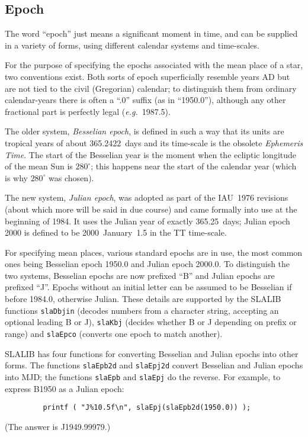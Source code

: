 \documentclass[11pt,fleqn,twoside]{article}
\renewcommand{\_}{{\tt\char'137}}     %
\begin{document}
\subsection{Epoch}
The word ``epoch'' just means a
significant moment in time, and can be supplied
in a variety of forms, using different calendar systems and time-scales.

For the purpose of specifying the epochs associated with the
mean place of a star, two conventions exist.  Both sorts of epoch
superficially resemble years AD but are not tied to the civil
(Gregorian) calendar;  to distinguish them from ordinary calendar-years
there is often
a ``.0'' suffix (as in ``1950.0''), although any other fractional
part is perfectly legal ({\it e.g.}\ 1987.5).

The older system,
{\it Besselian epoch}, is defined in such a way that its units are
tropical years of about 365.2422~days and its time-scale is the
obsolete {\it Ephemeris Time}.
The start of the Besselian year is the moment
when the ecliptic longitude of the mean Sun is
$280^{\circ}$;  this happens near the start of the
calendar year (which is why $280^{\circ}$ was chosen).
 
The new system, {\it Julian epoch}, was adopted as
part of the IAU~1976 revisions (about which more will be said
in due course) and came formally into use at the
beginning of 1984.  It uses the Julian year of exactly
365.25~days; Julian epoch 2000 is defined to be 2000~January~1.5 in the
TT time-scale.

For specifying mean places, various standard epochs are in use, the
most common ones being Besselian epoch 1950.0 and Julian epoch 2000.0.
To distinguish the two systems, Besselian epochs
are now prefixed ``B'' and Julian epochs are prefixed ``J''.
Epochs without an initial letter can be assumed to be Besselian
if before 1984.0, otherwise Julian.  These details are supported by
the SLALIB functions
{\tt slaDbjin}
(decodes numbers from a
character string, accepting an optional leading B or J),
{\tt slaKbj}
(decides whether B or J depending on prefix or range) and
{\tt slaEpco}
(converts one epoch to match another).
 
SLALIB has four functions for converting
Besselian and Julian epochs into other forms.
The functions
{\tt slaEpb2d}
and
{\tt slaEpj2d}
convert Besselian and Julian epochs into MJD; the functions
{\tt slaEpb}
and
{\tt slaEpj}
do the reverse.  For example, to express B1950 as a Julian epoch:
\goodbreak
\vspace{-3ex}
\begin{verbatim}
         printf ( "J%10.5f\n", slaEpj(slaEpb2d(1950.0)) );
\end{verbatim}
\vspace{-3ex}
\goodbreak
(The answer is J1949.99979.)
\end{document}
